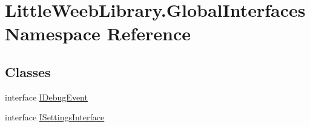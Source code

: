 \hypertarget{namespace_little_weeb_library_1_1_global_interfaces}{}\section{Little\+Weeb\+Library.\+Global\+Interfaces Namespace Reference}
\label{namespace_little_weeb_library_1_1_global_interfaces}
\subsection*{Classes}
\begin{DoxyCompactItemize}
\item 
interface \mbox{\hyperlink{interface_little_weeb_library_1_1_global_interfaces_1_1_i_debug_event}{I\+Debug\+Event}}
\item 
interface \mbox{\hyperlink{interface_little_weeb_library_1_1_global_interfaces_1_1_i_settings_interface}{I\+Settings\+Interface}}
\end{DoxyCompactItemize}
